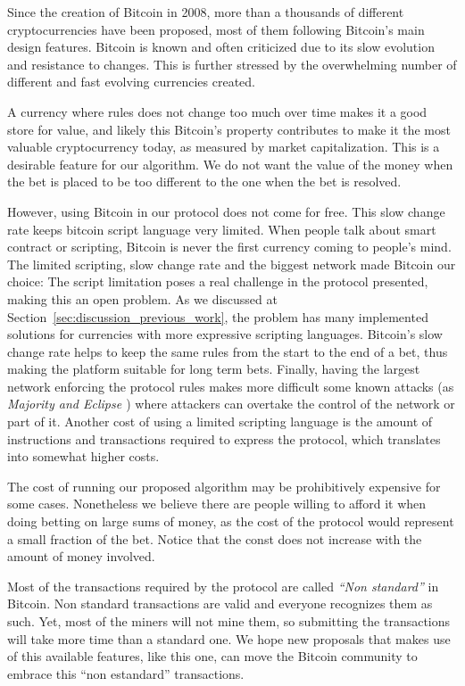 Since the creation of Bitcoin in 2008, more than a thousands of different
  cryptocurrencies have been proposed, most of them following Bitcoin's main
  design features.
Bitcoin is known and often criticized due to its slow evolution and resistance
  to changes.
This is further stressed by the overwhelming number of different and fast
  evolving currencies created.

A currency where rules does not change too much over time makes it a good store
  for value, and likely this Bitcoin's property contributes to make it the
  most valuable cryptocurrency today, as measured by market capitalization.
This is a desirable feature for our algorithm.
We do not want the value of the money when the bet is placed to be too different
  to the one when the bet
  is resolved.

However, using Bitcoin in our protocol does not come for free.
This slow change rate keeps bitcoin script language very limited.
When people talk about smart contract or scripting, Bitcoin is never the first
  currency coming to people's mind.
The limited scripting, slow change rate and the biggest network made Bitcoin our
  choice:
The script limitation poses a real challenge in the protocol presented, making
  this an open problem.
As we discussed at Section~\ref{sec:discussion_previous_work}, the problem has
  many implemented solutions for currencies with more expressive scripting
  languages.
Bitcoin's slow change rate helps to keep the same rules from the start to the
  end of a bet, thus making the platform suitable for long term bets.
Finally, having the largest network enforcing the protocol rules makes more
  difficult some known attacks (as \emph{Majority and Eclipse
  \cite{heilman2015eclipse}}) where attackers can overtake the control of the
  network or part of it.
Another cost of using a limited scripting language is the amount of instructions
  and transactions required to express the protocol, which translates into
  somewhat higher costs.

The cost of running our proposed algorithm may be prohibitively expensive for
  some cases.
Nonetheless we believe there are people willing to afford it when doing betting
  on large sums of money, as the cost of the protocol would represent a small
  fraction of the bet.
Notice that the const does not increase with the amount of money involved.

Most of the transactions required by the protocol are called
  \emph{``Non standard''} in Bitcoin.
Non standard transactions are valid and everyone recognizes them as such.
Yet, most of the miners will not mine them, so submitting the transactions
  will take more time than a standard one.
We hope new proposals that makes use of this available features, like this one,
  can move the Bitcoin community to embrace this ``non estandard'' transactions.


